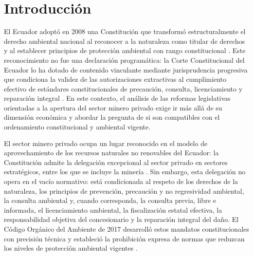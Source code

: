
\chapter*{Introducción}

El Ecuador adoptó en 2008 una Constitución que transformó estructuralmente el derecho ambiental nacional al reconocer a la naturaleza como titular de derechos y al establecer principios de protección ambiental con rango constitucional \parencite{cre_2008}. Este reconocimiento no fue una declaración programática: la Corte Constitucional del Ecuador lo ha dotado de contenido vinculante mediante jurisprudencia progresiva que condiciona la validez de las autorizaciones extractivas al cumplimiento efectivo de estándares constitucionales de precaución, consulta, licenciamiento y reparación integral \parencite{cce_1149_19_jp_21}. En este contexto, el análisis de las reformas legislativas orientadas a la apertura del sector minero privado exige ir más allá de su dimensión económica y abordar la pregunta de si son compatibles con el ordenamiento constitucional y ambiental vigente.

El sector minero privado ocupa un lugar reconocido en el modelo de aprovechamiento de los recursos naturales no renovables del Ecuador: la Constitución admite la delegación excepcional al sector privado en sectores estratégicos, entre los que se incluye la minería \parencite{cre_2008}. Sin embargo, esta delegación no opera en el vacío normativo: está condicionada al respeto de los derechos de la naturaleza, los principios de prevención, precaución y no regresividad ambiental, la consulta ambiental y, cuando corresponda, la consulta previa, libre e informada, el licenciamiento ambiental, la fiscalización estatal efectiva, la responsabilidad objetiva del concesionario y la reparación integral del daño. El Código Orgánico del Ambiente de 2017 desarrolló estos mandatos constitucionales con precisión técnica y estableció la prohibición expresa de normas que reduzcan los niveles de protección ambiental vigentes \parencite{coa_2017}.


